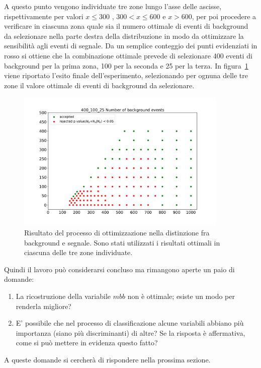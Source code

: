 A questo punto vengono individuate tre zone lungo l'asse delle ascisse, rispettivamente per valori $ x \le 300$ , $300 < x \le 600$ e $x > 600$, per poi procedere a verificare in ciascuna zona quale sia il numero ottimale di eventi di background da selezionare nella parte destra della distribuzione in modo da ottimizzare la sensibilità agli eventi di segnale. Da un semplice conteggio dei punti evidenziati in rosso si ottiene che la combinazione ottimale prevede di selezionare 400 eventi di background per la prima zona, 100 per la seconda e 25 per la terza. In figura~\ref{mix} viene riportato l'esito finale dell'esperimento, selezionando per ognuna delle tre zone il valore ottimale di eventi di background da selezionare.

\begin{figure}[h!]
	\centering
	\includegraphics[width=0.90\textwidth]{figs/risultati_simulazione/mix.pdf}
	\caption{Risultato del processo di ottimizzazione nella distinzione fra background e segnale. Sono stati utilizzati i risultati ottimali in ciascuna delle tre zone individuate.}
	\label{mix}
\end{figure}

Quindi il lavoro può considerarsi concluso ma rimangono aperte un paio di domande:
\begin{enumerate}
	\item La ricostruzione della variabile $\textit{mbb}$ non è ottimale; esiste un modo per renderla migliore?
	\item E' possibile che nel processo di classificazione alcune variabili abbiano più importanza (siano più discriminanti) di altre? Se la risposta è affermativa, come si può mettere in evidenza questo fatto?
\end{enumerate} 
A queste domande si cercherà di rispondere nella prossima sezione.\\


